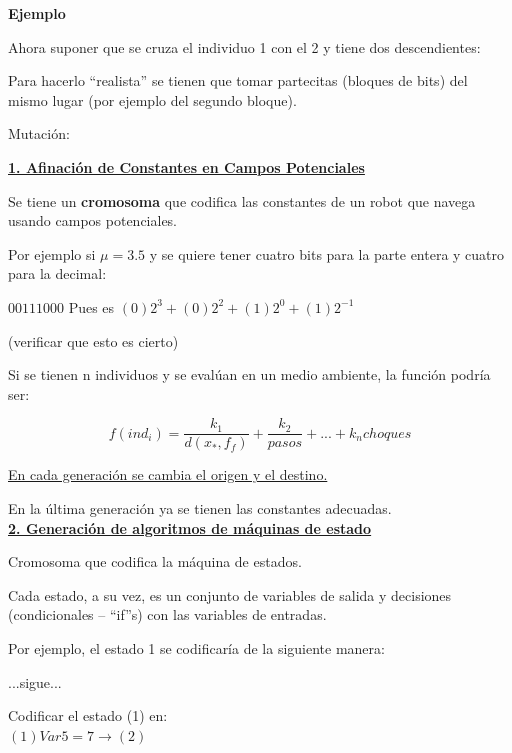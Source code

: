 \textbf{Ejemplo}


Ahora suponer que se cruza el individuo 1 con el 2 y tiene dos descendientes:


Para hacerlo “realista” se tienen que tomar partecitas (bloques de bits) del mismo lugar (por ejemplo del
segundo bloque).

Mutación:


\textbf{\underline{1. Afinación de Constantes en Campos Potenciales}}

Se tiene un \textbf{cromosoma} que codifica las constantes de un robot que navega usando campos potenciales.


Por ejemplo si $\mu = 3.5$ y se quiere tener cuatro bits para la parte entera y cuatro para la decimal:

$0011 1000$
Pues es $(0)2^3 + (0)2^2 + (1)2^0 + (1)2^{-1}$

(verificar que esto es cierto)

Si se tienen n individuos y se evalúan en un medio ambiente, la función podría ser:

$$ f(ind_i) = \dfrac{k_1}{d(x_*,f_f)} + \dfrac{k_2}{pasos} + ... + k_n choques $$

\underline{En cada generación se cambia el origen y el destino.}

En la última generación ya se tienen las constantes adecuadas. \\


\textbf{\underline{2. Generación de algoritmos de máquinas de estado}}

Cromosoma que codifica la máquina de estados.


Cada estado, a su vez, es un conjunto de variables de salida y decisiones (condicionales – “if”s) con las
variables de entradas.


Por ejemplo, el estado 1 se codificaría de la siguiente manera:


...sigue...


\begin{ejemplo}
Codificar el estado (1) en: \\
$(1) Var5 = 7 \rightarrow (2)$
\end{ejemplo}

